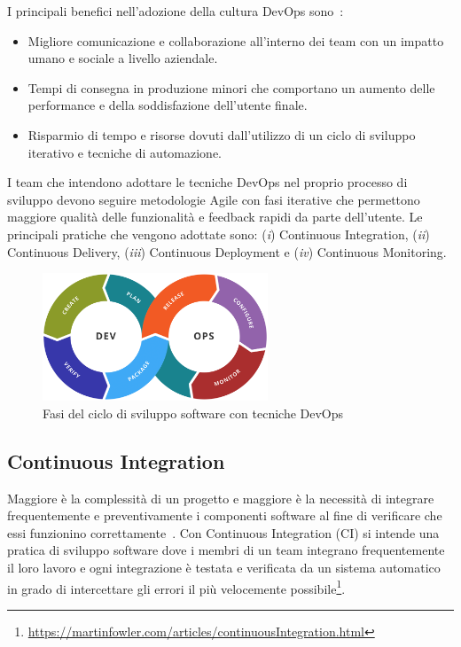 I principali benefici nell'adozione della cultura DevOps sono~\cite{krief2019learning}:
\begin{itemize}
    \item Migliore comunicazione e collaborazione all'interno dei team con un impatto umano e sociale a livello aziendale.
    \item Tempi di consegna in produzione minori che comportano un aumento delle performance e della soddisfazione dell'utente finale.
    \item Risparmio di tempo e risorse dovuti dall'utilizzo di un ciclo di sviluppo iterativo e tecniche di automazione.
\end{itemize}

I team che intendono adottare le tecniche DevOps nel proprio processo di sviluppo devono seguire metodologie Agile con fasi iterative che permettono maggiore qualità delle funzionalità e feedback rapidi da parte dell'utente. Le principali pratiche che vengono adottate sono: (\textit{i}) Continuous Integration, (\textit{ii}) Continuous Delivery, (\textit{iii}) Continuous Deployment e (\textit{iv}) Continuous Monitoring.

\begin{figure}[H]
    \centering
    \includegraphics[width=0.6\textwidth]{img/Devops-toolchain.png}
    \caption{Fasi del ciclo di sviluppo software con tecniche DevOps}
\end{figure}

\subsection{Continuous Integration}
\label{ci-sec}
Maggiore è la complessità di un progetto e maggiore è la necessità di integrare frequentemente e preventivamente i componenti software al fine di verificare che essi funzionino correttamente~\cite{duvall2007continuous}. Con Continuous Integration (CI) si intende una pratica di sviluppo software dove i membri di un team integrano frequentemente il loro lavoro e ogni integrazione è testata e verificata da un sistema automatico in grado di intercettare gli errori il più velocemente possibile\footnote{\href{https://martinfowler.com/articles/continuousIntegration.html}{https://martinfowler.com/articles/continuousIntegration.html}}.

